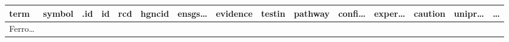 \documentclass[
]{article}
\begin{document}
\begin{longtable}[]{@{}lllllllllllllll@{}}
\midrule
\endfirsthead
\toprule
\begin{minipage}[b]{0.05\columnwidth}\raggedright
term\strut
\end{minipage} & \begin{minipage}[b]{0.05\columnwidth}\raggedright
symbol\strut
\end{minipage} & \begin{minipage}[b]{0.04\columnwidth}\raggedright
.id\strut
\end{minipage} & \begin{minipage}[b]{0.02\columnwidth}\raggedright
id\strut
\end{minipage} & \begin{minipage}[b]{0.05\columnwidth}\raggedright
rcd\strut
\end{minipage} & \begin{minipage}[b]{0.05\columnwidth}\raggedright
hgncid\strut
\end{minipage} & \begin{minipage}[b]{0.05\columnwidth}\raggedright
ensgs\ldots{}\strut
\end{minipage} & \begin{minipage}[b]{0.05\columnwidth}\raggedright
evidence\strut
\end{minipage} & \begin{minipage}[b]{0.05\columnwidth}\raggedright
testin\strut
\end{minipage} & \begin{minipage}[b]{0.05\columnwidth}\raggedright
pathway\strut
\end{minipage} & \begin{minipage}[b]{0.05\columnwidth}\raggedright
confi\ldots{}\strut
\end{minipage} & \begin{minipage}[b]{0.05\columnwidth}\raggedright
exper\ldots{}\strut
\end{minipage} & \begin{minipage}[b]{0.05\columnwidth}\raggedright
caution\strut
\end{minipage} & \begin{minipage}[b]{0.05\columnwidth}\raggedright
unipr\ldots{}\strut
\end{minipage} & \begin{minipage}[b]{0.02\columnwidth}\raggedright
\ldots{}\strut
\end{minipage}\tabularnewline
\midrule
\endhead
\begin{minipage}[t]{0.05\columnwidth}\raggedright
Ferro\ldots{}\strut
\end{minipage} & \begin{minipage}[t]{0.05\columnwidth}\raggedright

\end{minipage}
\end{longtable}
\end{document}
